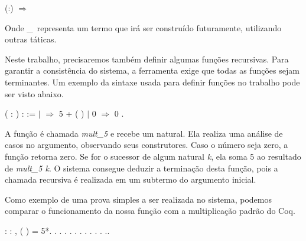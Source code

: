 \bigskip
{} (:) \ensuremath{\Rightarrow} \coqdocvar{\_}\coqdoceol
\bigskip

Onde \_\ representa um termo que irá ser construído futuramente, utilizando
outras táticas. 

Neste trabalho, precisaremos também definir algumas funções recursivas. Para
garantir a consistência do sistema, a ferramenta exige que todas as funções
sejam terminantes. Um exemplo da sintaxe usada para definir funções no trabalho
pode ser visto abaixo.

\bigskip
\coqdocnoindent {}  ( :
) :  :=\coqdoceol \coqdocindent{2.00em}
  \coqdoceol \coqdocindent{2.00em}
\ensuremath{|}   \ensuremath{\Rightarrow} 5 +
( )\coqdoceol \coqdocindent{2.00em}
\ensuremath{|} 0   \ensuremath{\Rightarrow} 0\coqdoceol \coqdocindent{2.00em}
.\coqdoceol \coqdocemptyline
\bigskip

A função é chamada \emph{mult\_5} e recebe um natural. Ela realiza uma
análise de casos no argumento, observando seus construtores. Caso o número seja
zero, a função retorna zero. Se for o sucessor de algum natural \emph{k}, ela
soma 5 ao resultado de \emph{mult\_5 k}. O sistema consegue deduzir a
terminação desta função, pois a chamada recursiva é realizada em um subtermo do
argumento inicial.

Como exemplo de uma prova simples a ser realizada no sistema, podemos comparar
o funcionamento da nossa função com a multiplicação padrão do Coq.

\bigskip
\coqdocnoindent
{} :
\coqdockw{\ensuremath{\forall}}  : ,
( ) = 5*.\coqdoceol \coqdocnoindent
{}.\coqdoceol \coqdocindent{2.00em} .\coqdoceol
\coqdocindent{2.00em}  .\coqdoceol
\coqdocindent{2.00em} . .\coqdoceol
\coqdocindent{2.00em}  .\coqdoceol
\coqdocindent{2.00em}  .\coqdoceol
\coqdocindent{2.00em} .\coqdoceol \coqdocindent{2.00em}
 .\coqdoceol \coqdocindent{2.00em}
 .\coqdoceol \coqdocindent{2.00em}
.\coqdoceol \coqdocnoindent {}.\coqdoceol
\bigskip

